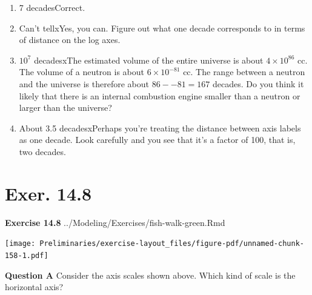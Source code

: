 \documentclass[
  letterpaper,
  DIV=11,
  numbers=noendperiod,
  oneside]{article}
\providecommand{\tightlist}{%
  \setlength{\itemsep}{0pt}\setlength{\parskip}{0pt}}\usepackage{longtable,booktabs,array}
\begin{document}
\begin{multicols}{2}
\begin{enumerate}
\def\labelenumi{\roman{enumi}.}
\tightlist
\item
  {7 decades{Correct.~}}\\
\item
  {Can't tell{xYes, you can. Figure out what one decade corresponds to
  in terms of distance on the log axes.}}\\
\item
  {\(10^7\) decades{xThe estimated volume of the entire universe is
  about \(4 \times 10^{86}\) cc. The volume of a neutron is about
  \(6 \times 10^{-81}\) cc. The range between a neutron and the universe
  is therefore about \(86 - -81 = 167\) decades. Do you think it likely
  that there is an internal combustion engine smaller than a neutron or
  larger than the universe?}}\\
\item
  {About 3.5 decades{xPerhaps you're treating the distance between
  axis labels as one decade. Look carefully and you see that it's a
  factor of 100, that is, two decades.}}
\end{enumerate}

\hypertarget{exer.-14.8}{%
\section*{Exer. 14.8}\label{exer.-14.8}}

\textbf{Exercise 14.8} ../Modeling/Exercises/fish-walk-green.Rmd

\texttt{[image: Preliminaries/exercise-layout\_files/figure-pdf/unnamed-chunk-158-1.pdf]}

\textbf{Question A} Consider the axis scales shown above. Which kind of
scale is the horizontal axis?


\end{multicols}
\end{document}

